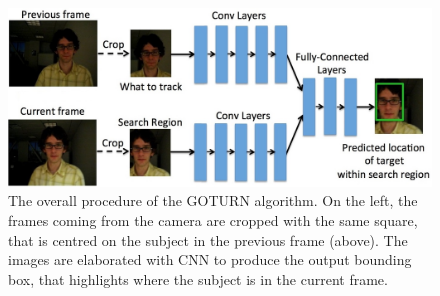 \begin{figure}[!h]
	\centering
	\includegraphics[width=1\linewidth]{images/tracking/howItWorks_GOTURN}
	\captionsetup{margin=0.5cm}
	\caption[The overall procedure of the GOTURN algorithm.]{The overall procedure of the GOTURN algorithm. On the left, the frames coming from the camera are cropped with the same square, that is centred on the subject in the previous frame (above). The images are elaborated with CNN to produce the output bounding box, that highlights where the subject is in the current frame.}
	\label{fig:howItWorks_GOTURN}
\end{figure}

